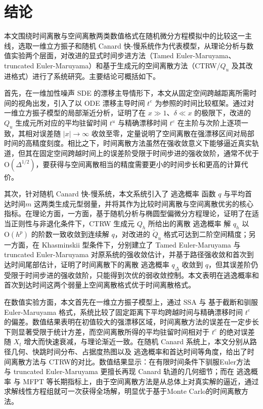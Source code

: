 \section{结论}

本文围绕时间离散与空间离散两类数值格式在随机微分方程模拟中的比较这一主线，选取一维立方振子和随机 Canard 快-慢系统作为代表模型，从理论分析与数值实验两个层面，对改进的显式时间步进方法（Tamed Euler-Maruyama、truncated Euler-Maruyama）和基于生成元的空间离散方法（CTRW/\(Q_u\) 及其改进格式）进行了系统研究。主要结论可概括如下。

首先，在一维加性噪声 SDE 的漂移主导情形下，本文从固定空间跨越距离所需时间的视角出发，引入了以 ODE 漂移主导时间 \(t^e\) 为参照的时间比较框架。通过对一维立方振子模型的局部渐近分析，证明了在 \(x\gg 1\)、\(\delta\ll x\) 的极限下，改进的 \(Q_u\) 生成元所对应的平均驻留时间 \(t^u\) 与精确漂移时间 \(t^e\) 在主阶与次阶上逐项一致，其相对误差随 \(|x|\to\infty\) 收敛至零，定量说明了空间离散在强漂移区间对局部时间的高精度刻度。相比之下，时间离散方法虽然在强收敛意义下能够逼近真实轨道，但其在固定空间跨越时间上的误差阶受限于时间步进的强收敛阶，通常不优于 \(\mathrm{O}(\Delta^{1/2})\)，要获得与空间离散相当的精度需要更小的时间步长和更高的计算代价。

其次，针对随机 Canard 快-慢系统，本文系统引入了 逃逸概率 函数 \(q\) 与平均首达时间\(m\) 这两类生成元型弱量，并将其作为比较时间离散与空间离散优劣的核心指标。在理论方面，一方面，基于随机分析与椭圆型偏微分方程理论，证明了在适当正则性与非退化条件下，CTRW 生成元 \(Q_h\) 所给出的离散 逃逸概率 解 \(q_h\) 以 \(\mathrm{O}(h^p)\) 的阶数一致收敛到连续解 \(q\)，对改进的 \(\widetilde Q_u\) 格式可达到二阶空间精度；另一方面，在 Khasminskii 型条件下，分别建立了 Tamed Euler-Maruyama 与 truncated Euler-Maruyama 对原系统的强收敛估计，并基于路径强收敛和首次到达时间尾部估计，证明了时间离散下的离散 逃逸概率 \(q_\Delta\) 收敛到 \(q\)，但其误差阶仍受限于时间步进的强收敛阶，只能得到次优的弱收敛控制。本文表明在逃逸概率和首次到达时间这两个弱量上空间离散格式优于时间离散格式。

在数值实验方面，本文首先在一维立方振子模型上，通过 SSA 与 基于截断和驯服 Euler-Maruyama 格式，系统比较了固定距离下平均跨越时间与精确漂移时间 \(t^e\) 的偏差。数值结果表明在初值较大的强漂移区域，时间离散方法的误差在一定步长下则显著受限于统计方差，而空间离散所得的平均驻留时间相对于 \(t^e\) 的绝对误差随 \(X_t\) 增大而快速衰减，与理论渐近一致。在随机 Canard 系统上，本文分别从路径几何、快跳时间分布、占据度热图以及 逃逸概率和首达时间等角度，给出了时间离散方法与 CTRW的对比。数值结果显示：在有限时间条件下驯服Euler方法 与 truncated Euler-Maruyama 更擅长再现 Canard 轨道的几何细节；而在 逃逸概率 与 MFPT 等长期指标上，由于空间离散方法是从总体上对真实解的逼近，通过求解线性方程组就可一次获得全场解，明显优于基于Monte Carlo的时间离散方法。


